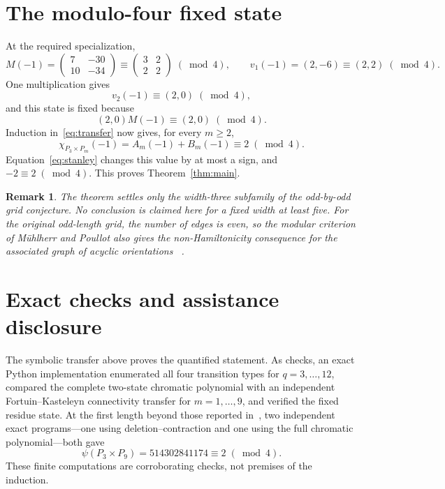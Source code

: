 \documentclass[11pt]{article}
\newtheorem{remark}{Remark}
\newcommand{\psia}{\psi}
\begin{document}
\section{The modulo-four fixed state}

At the required specialization,
\[
 M(-1)=\left(\begin{array}{cc}7&-30\\10&-34\end{array}\right)
 \equiv\left(\begin{array}{cc}3&2\\2&2\end{array}\right)\;(\bmod 4),
 \qquad
 v_1(-1)=(2,-6)\equiv(2,2)\;(\bmod 4).
\]
One multiplication gives
\[
  v_2(-1)\equiv(2,0)\;(\bmod 4),
\]
and this state is fixed because
\[
  (2,0)M(-1)\equiv(2,0)\;(\bmod 4).
\]
Induction in~\eqref{eq:transfer} now gives, for every $m\geq2$,
\[
 \chi_{P_3\times P_m}(-1)
 =A_m(-1)+B_m(-1)\equiv2\;(\bmod 4).
\]
Equation~\eqref{eq:stanley} changes this value by at most a sign, and
$-2\equiv2\;(\bmod 4)$.  This proves Theorem~\ref{thm:main}.

\begin{remark}
The theorem settles only the width-three subfamily of the odd-by-odd grid
conjecture.  No conclusion is claimed here for a fixed width at least five.
For the original odd-length grid, the number of edges is even, so the modular
criterion of Mühlherr and Poullot also gives the non-Hamiltonicity consequence
for the associated graph of acyclic orientations
~\cite[Lemma~3.2]{MuehlherrPoullot2026}.
\end{remark}

\section*{Exact checks and assistance disclosure}

The symbolic transfer above proves the quantified statement.  As checks, an
exact Python implementation enumerated all four transition types for
$q=3,\ldots,12$, compared the complete two-state chromatic polynomial with an
independent Fortuin--Kasteleyn connectivity transfer for $m=1,\ldots,9$, and
verified the fixed residue state.  At the first length beyond those reported
in~\cite{MuehlherrPoullot2026}, two independent exact programs---one using
deletion--contraction and one using the full chromatic polynomial---both gave
\[
 \psia(P_3\times P_9)=514302841174\equiv2\;(\bmod 4).
\]
These finite computations are corroborating checks, not premises of the
induction.
\end{document}
